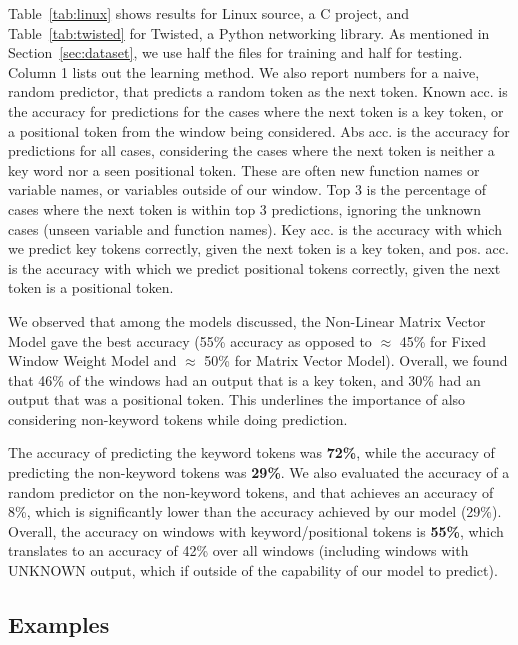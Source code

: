 \noindent
Table~\ref{tab:linux} shows results for Linux source, a C project, and
Table~\ref{tab:twisted} for Twisted, a Python networking library. As mentioned
in Section~\ref{sec:dataset}, we use half the files for training and half for
testing.
Column 1
lists out the learning method. We also report numbers for a naive, random
predictor, that predicts a random token as the next token. Known acc. is the
accuracy for predictions for the cases where the next token is a key token, or
a positional token from the window being considered. Abs acc. is the accuracy
for predictions for all cases, considering the cases where the next token is
neither a key word nor a seen positional token. These are often new function
names or variable names, or variables outside of our window. Top 3 is the
percentage of cases where the next token is within top 3 predictions, ignoring
the unknown cases (unseen variable and function names). Key acc. is the
accuracy with which we predict key tokens correctly, given the next token is a
key token,
and pos. acc. is the accuracy with which we predict positional tokens
correctly, given the next token is a positional token.

We observed that among the models discussed, the Non-Linear Matrix Vector Model
gave the best accuracy (55\% accuracy as opposed to $\approx$ 45\% for Fixed
Window Weight Model and $\approx$ 50\% for Matrix Vector Model). Overall, we
found that 46\% of the windows had an output that is a key token, and 30\% had
an output that was a positional token. This underlines the importance of also
considering non-keyword tokens while doing prediction.

The accuracy of predicting the keyword tokens was {\bf 72\%}, while the accuracy
of predicting the non-keyword tokens was {\bf 29\%}. We also evaluated the
accuracy of a random predictor on the non-keyword tokens, and that achieves an
accuracy of 8\%, which is significantly lower than the accuracy achieved by our
model (29\%). Overall, the accuracy on windows with keyword/positional tokens is
{\bf 55\%}, which translates to an accuracy of 42\% over all windows (including
windows with UNKNOWN output, which if outside of the capability of our model to
predict).

\subsection{Examples}
\label{sec:examples}

